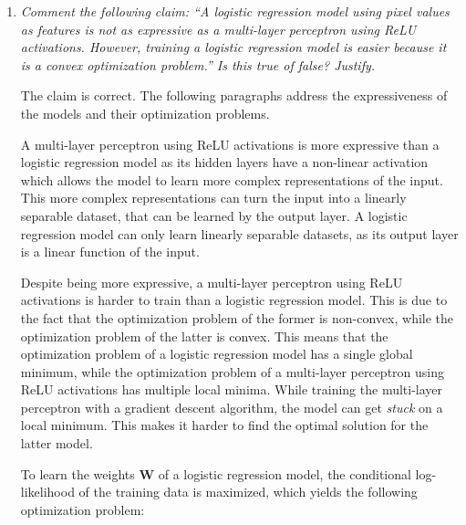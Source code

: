 \documentclass[12pt]{article}
\begin{document}
\begin{enumerate}[leftmargin=\labelsep]
          \begin{enumerate}[label=\alph*)]

              \item \textit{Comment the following claim: “A logistic regression model using pixel values
                        as features is not as expressive as a multi-layer perceptron using ReLU activations.
                        However, training a logistic regression model is easier because it is a convex optimization
                        problem.” Is this true of false? Justify.}

                    \vspace{12pt}

                    The claim is correct. The following paragraphs address the expressiveness of the models and their optimization problems. \\

                    \vspace{12pt}

                    A multi-layer perceptron using ReLU activations is more expressive than a logistic regression model as its hidden layers have a non-linear activation which allows the model to learn more complex representations of the input. This more complex representations can turn the input into a linearly separable dataset, that can be learned by the output layer. A logistic regression model can only learn linearly separable datasets, as its output layer is a linear function of the input.

                    \vspace{12pt}

                    Despite being more expressive, a multi-layer perceptron using ReLU activations is harder to train than a logistic regression model. This is due to the fact that the optimization problem of the former is non-convex, while the optimization problem of the latter is convex. This means that the optimization problem of a logistic regression model has a single global minimum, while the optimization problem of a multi-layer perceptron using ReLU activations has multiple local minima. While training the multi-layer perceptron with a gradient descent algorithm, the model can get \textit{stuck} on a local minimum. This makes it harder to find the optimal solution for the latter model.

                    \vspace{12pt}

                    To learn the weights \textbf{W} of a logistic regression model, the conditional log-likelihood of the training data is maximized, which yields the following optimization problem:


\end{enumerate}
\end{enumerate}
\end{document}
